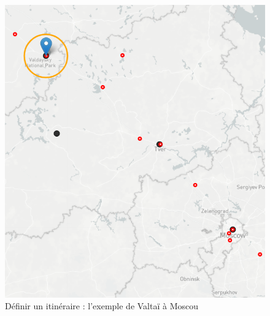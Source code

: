 \documentclass[a4paper, 12pt, twoside]{book}
\begin{document}
\begin{figure}[h!]
\centering
\includegraphics[scale=0.5]{img/chronotopographie/chrono_valdai_moscou.png}
\caption{Définir un itinéraire : l'exemple de Valtaï à Moscou}
\end{figure}
\newpage
\end{document}
